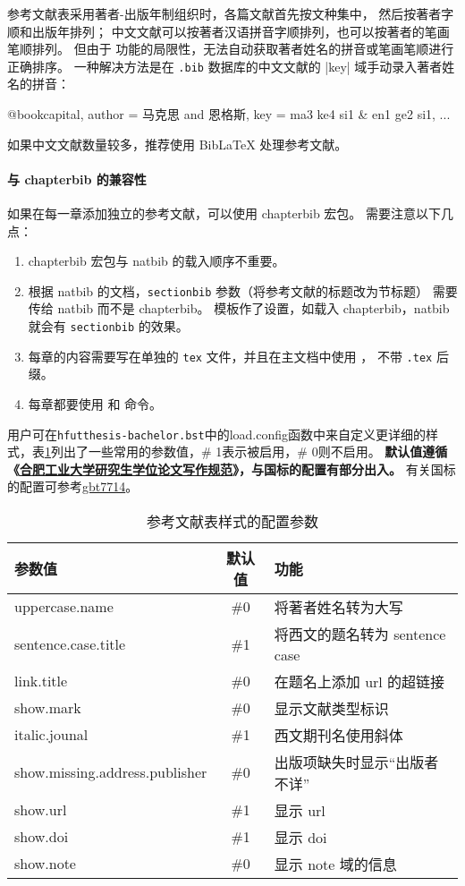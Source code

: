 \documentclass[a4paper]{ltxdoc}
\DeclareRobustCommand\file{\nolinkurl}
\DeclareRobustCommand\pkg{\textsf}
\DeclareRobustCommand\opt{\texttt}
\begin{document}
参考文献表采用著者-出版年制组织时，各篇文献首先按文种集中， 然后按著者字顺和出版年排列；
中文文献可以按著者汉语拼音字顺排列，也可以按著者的笔画笔顺排列。
但由于 \BibTeX{} 功能的局限性，无法自动获取著者姓名的拼音或笔画笔顺进行正确排序。
一种解决方法是在 \file{.bib} 数据库的中文文献的 |key| 域手动录入著者姓名的拼音：
\begin{latex}
  @book{capital,
    author = {马克思 and 恩格斯},
    key    = {ma3 ke4 si1 & en1 ge2 si1},
    ...
  }
\end{latex}
如果中文文献数量较多，推荐使用 BibLaTeX 处理参考文献。

\paragraph{与 \pkg{chapterbib} 的兼容性}
如果在每一章添加独立的参考文献，可以使用 \pkg{chapterbib} 宏包。
需要注意以下几点：
\begin{enumerate}
  \item \pkg{chapterbib} 宏包与 \pkg{natbib} 的载入顺序不重要。
  \item 根据 \pkg{natbib} 的文档，\opt{sectionbib} 参数（将参考文献的标题改为节标题）
    需要传给 \pkg{natbib} 而不是 \pkg{chapterbib}。
    模板作了设置，如载入 \pkg{chapterbib}，\pkg{natbib} 就会有 \opt{sectionbib} 的效果。
  \item 每章的内容需要写在单独的 \file{tex} 文件，并且在主文档中使用 ，
    不带 \file{.tex} 后缀。
  \item 每章都要使用  和  命令。
\end{enumerate}

用户可在\file{hfutthesis-bachelor.bst}中的load.config函数中来自定义更详细的样式，表\ref{canshu}列出了一些常用的参数值，\# 1表示被启用，\# 0则不启用。
\textbf{默认值遵循《\href{http://xwgl.hfut.edu.cn/2021/0419/c1975a253949/page.htm}{合肥工业大学研究生学位论文写作规范}》，与国标的配置有部分出入。}
有关国标的配置可参考\href{https://ctan.org/pkg/gbt7714}{\pkg{gbt7714}}。

\begin{table}
  \caption{参考文献表样式的配置参数}\label{canshu}
  \begin{tabular}{lcl}
    \hline 参数值 & 默认值 & 功能 \\
    \hline uppercase.name & \#0 & 将著者姓名转为大写 \\
     sentence.case.title & \#1 & 将西文的题名转为 sentence case \\
    link.title &\#0 & 在题名上添加 url 的超链接 \\
    show.mark & \#0 & 显示文献类型标识 \\
    italic.jounal & \#1 & 西文期刊名使用斜体 \\
    show.missing.address.publisher & \#0 & 出版项缺失时显示“出版者不详” \\
    show.url & \#1 & 显示 url \\
    show.doi & \#1 & 显示 doi \\
    show.note & \#0 & 显示 note 域的信息 \\
    \hline
    \end{tabular}
\end{table}
\end{document}
